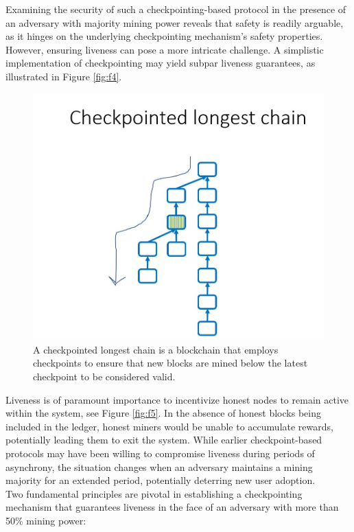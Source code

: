 \documentclass{report}
\begin{document}
Examining the security of such a checkpointing-based protocol in the presence of an adversary with majority mining power reveals that safety is readily arguable, as it hinges on the underlying checkpointing mechanism's safety properties. However, ensuring liveness can pose a more intricate challenge. A simplistic implementation of checkpointing may yield subpar liveness guarantees, as illustrated in Figure \ref{fig:f4}.
\begin{center}
	\begin{figure}
		\centering
		\includegraphics[width=0.5\linewidth]{Fig/F3}
		\caption{A checkpointed longest chain is a blockchain that employs checkpoints to ensure that new blocks are mined below the latest checkpoint to be considered valid.}
		\label{fig:f3}
	\end{figure}
\end{center}
Liveness is of paramount importance to incentivize honest nodes to remain active within the system, see Figure \ref{fig:f5}. In the absence of honest blocks being included in the ledger, honest miners would be unable to accumulate rewards, potentially leading them to exit the system. While earlier checkpoint-based protocols may have been willing to compromise liveness during periods of asynchrony, the situation changes when an adversary maintains a mining majority for an extended period, potentially deterring new user adoption.\\
Two fundamental principles are pivotal in establishing a checkpointing mechanism that guarantees liveness in the face of an adversary with more than 50\% mining power:
\end{document}

